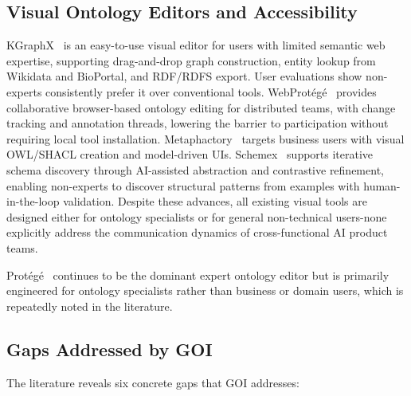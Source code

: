 \documentclass[runningheads,a4paper]{llncs}
\begin{document}
\subsection{Visual Ontology Editors and Accessibility}

KGraphX~\cite{hemid2024kgraphx} is an easy-to-use visual editor
for users with limited semantic web expertise, supporting drag-and-drop
graph construction, entity lookup from Wikidata and BioPortal, and
RDF/RDFS export. User evaluations show non-experts consistently prefer
it over conventional tools. WebProt\'eg\'e~\cite{tudorache2013webprotege}
provides collaborative browser-based ontology editing for distributed
teams, with change tracking and annotation threads, lowering the barrier
to participation without requiring local tool installation.
Metaphactory~\cite{haase2019metaphactory} targets business users with
visual OWL/SHACL creation and model-driven UIs. Schemex~\cite{sadeh2024schemex}
supports iterative schema discovery through AI-assisted abstraction and
contrastive refinement, enabling non-experts to discover structural
patterns from examples with human-in-the-loop validation.
Despite these advances, all existing visual tools are designed either
for ontology specialists or for general non-technical users-none
explicitly address the communication dynamics of cross-functional AI
product teams.

Prot\'eg\'e~\cite{musen2015protege} continues to be the dominant expert
ontology editor but is primarily engineered for ontology specialists
rather than business or domain users, which is repeatedly noted in the
literature.

\subsection{Gaps Addressed by GOI}

The literature reveals six concrete gaps that GOI addresses:
\end{document}
